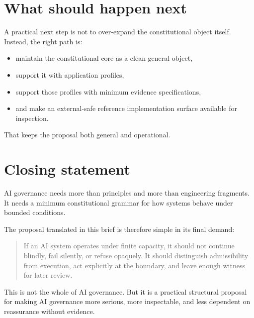 \documentclass[11pt]{article}
\begin{document}
\section{What should happen next}

A practical next step is not to over-expand the constitutional object itself. Instead, the right path is:
\begin{itemize}[leftmargin=2em]
    \item maintain the constitutional core as a clean general object,
    \item support it with application profiles,
    \item support those profiles with minimum evidence specifications,
    \item and make an external-safe reference implementation surface available for inspection.
\end{itemize}

That keeps the proposal both general and operational.

\section{Closing statement}

AI governance needs more than principles and more than engineering fragments. It needs a minimum constitutional grammar for how systems behave under bounded conditions.

The proposal translated in this brief is therefore simple in its final demand:

\begin{quote}
If an AI system operates under finite capacity, it should not continue blindly, fail silently, or refuse opaquely. It should distinguish admissibility from execution, act explicitly at the boundary, and leave enough witness for later review.
\end{quote}

This is not the whole of AI governance. But it is a practical structural proposal for making AI governance more serious, more inspectable, and less dependent on reassurance without evidence.
\end{document}
